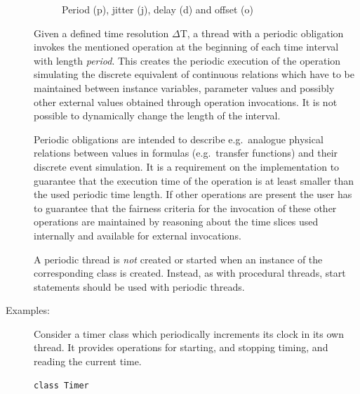 \documentclass{overturerepchap}
\begin{document}
\begin{description}
\begin{figure}
\begin{center}
\caption{{Period (p), jitter (j), delay (d) and offset (o)}\label{fig:PeriodJitterDelayOffset}}
\end{center}
\end{figure}

Given a defined time resolution $\Delta$T, a thread with a periodic
obligation invokes the mentioned operation at the beginning of each
time interval with length {\em period}.  This creates the periodic
execution of the operation simulating the discrete equivalent of
continuous relations which have to be maintained between instance
variables, parameter values and possibly other external values
obtained through operation invocations.  It is not possible to dynamically 
change the length of the interval.

Periodic obligations are intended to describe e.g.\
analogue physical relations between values in formulas (e.g.\ transfer
functions) and their discrete event simulation.
It is a requirement on the implementation to
guarantee that the execution time of the operation is at least smaller
than the used periodic time length.
If other operations are present the user has to guarantee that
the fairness criteria for the invocation of these other operations are
maintained by reasoning about the time slices used internally and
available for external invocations.

A periodic thread is \textit{not} created or started when an instance of the
corresponding class is created. Instead, as with procedural threads,
start statements should be used with periodic threads. 


\item[Examples:]
Consider a timer class which periodically increments its  clock in its
own thread. It provides operations for starting, and stopping timing,
and reading the current time. 

\begin{lstlisting}
class Timer
\end{lstlisting}


\end{description}
\end{document}
